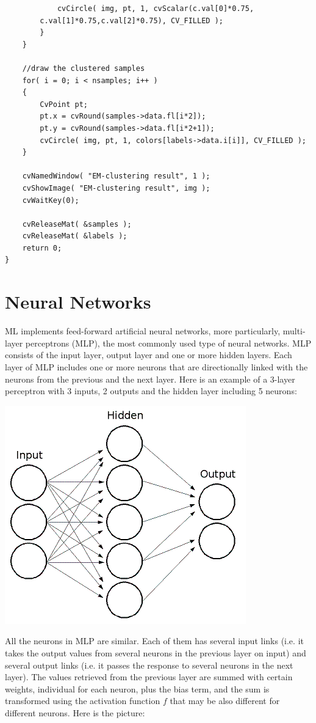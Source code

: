 \begin{lstlisting}
            cvCircle( img, pt, 1, cvScalar(c.val[0]*0.75,
		c.val[1]*0.75,c.val[2]*0.75), CV_FILLED );
        }
    }

    //draw the clustered samples
    for( i = 0; i < nsamples; i++ )
    {
        CvPoint pt;
        pt.x = cvRound(samples->data.fl[i*2]);
        pt.y = cvRound(samples->data.fl[i*2+1]);
        cvCircle( img, pt, 1, colors[labels->data.i[i]], CV_FILLED );
    }

    cvNamedWindow( "EM-clustering result", 1 );
    cvShowImage( "EM-clustering result", img );
    cvWaitKey(0);

    cvReleaseMat( &samples );
    cvReleaseMat( &labels );
    return 0;
}

\end{lstlisting}

\section{Neural Networks}

ML implements feed-forward artificial neural networks, more particularly, multi-layer perceptrons (MLP), the most commonly used type of neural networks. MLP consists of the input layer, output layer and one or more hidden layers. Each layer of MLP includes one or more neurons that are directionally linked with the neurons from the previous and the next layer. Here is an example of a 3-layer perceptron with 3 inputs, 2 outputs and the hidden layer including 5 neurons:

\includegraphics{pics/mlp_.png}

All the neurons in MLP are similar. Each of them has several input links (i.e. it takes the output values from several neurons in the previous layer on input) and several output links (i.e. it passes the response to several neurons in the next layer). The values retrieved from the previous layer are summed with certain weights, individual for each neuron, plus the bias term, and the sum is transformed using the activation function $f$ that may be also different for different neurons. Here is the picture:


